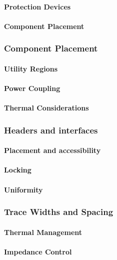 \paragraph{Protection Devices}
\paragraph{Component Placement}

\subsubsection{Component Placement}
\paragraph{Utility Regions}
\paragraph{Power Coupling}
\paragraph{Thermal Considerations}

\subsubsection{Headers and interfaces}
\paragraph{Placement and accessibility}
\paragraph{Locking}
\paragraph{Uniformity}

\subsubsection{Trace Widths and Spacing}
\paragraph{Thermal Management}
\paragraph{Impedance Control}
